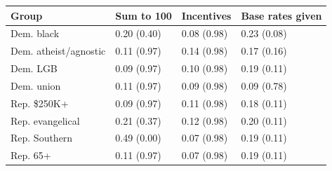 
\begin{tabular}{llll}
\toprule
Group & Sum to 100 & Incentives & Base rates given\\
\midrule
Dem. black & 0.20 (0.40) & 0.08 (0.98) & 0.23 (0.08)\\
Dem. atheist/agnostic & 0.11 (0.97) & 0.14 (0.98) & 0.17 (0.16)\\
Dem. LGB & 0.09 (0.97) & 0.10 (0.98) & 0.19 (0.11)\\
Dem. union & 0.11 (0.97) & 0.09 (0.98) & 0.09 (0.78)\\
Rep. \$250K+ & 0.09 (0.97) & 0.11 (0.98) & 0.18 (0.11)\\
Rep. evangelical & 0.21 (0.37) & 0.12 (0.98) & 0.20 (0.11)\\
Rep. Southern & 0.49 (0.00) & 0.07 (0.98) & 0.19 (0.11)\\
Rep. 65+ & 0.11 (0.97) & 0.07 (0.98) & 0.19 (0.11)\\
\bottomrule
\end{tabular}
